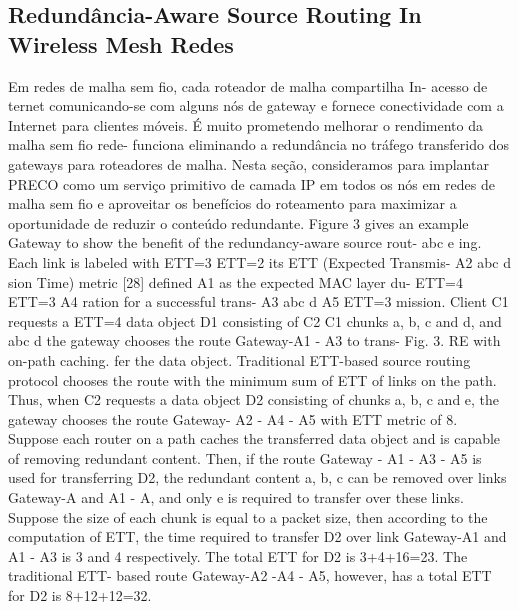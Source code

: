 \documentclass[12pt]{article}
\begin{document}
	\subsection{Redundância-Aware Source Routing In Wireless Mesh
		Redes}
	
	Em redes de malha sem fio, cada roteador de malha compartilha In-
	acesso de ternet comunicando-se com alguns nós de gateway
	e fornece conectividade com a Internet para clientes móveis. É muito
	prometendo melhorar o rendimento da malha sem fio rede-
	funciona eliminando a redundância no tráfego transferido
	dos gateways para roteadores de malha. Nesta seção, consideramos
	para implantar PRECO como um serviço primitivo de camada IP em todos os nós
	em redes de malha sem fio e aproveitar os benefícios do roteamento
	para maximizar a oportunidade de reduzir o conteúdo redundante.
	Figure 3 gives an example
	Gateway
	to show the benefit of the
	redundancy-aware source rout-
	abc e
	ing. Each link is labeled with
	ETT=3
	ETT=2
	its ETT (Expected Transmis-
	A2
	abc d
	sion Time) metric [28] defined
	A1
	as the expected MAC layer du-
	ETT=4
	ETT=3
	A4
	ration for a successful trans-
	A3
	abc d
	A5 ETT=3
	mission. Client C1 requests a
	ETT=4
	data object D1 consisting of
	C2
	C1
	chunks a, b, c and d, and
	abc d
	the gateway chooses the route
	Gateway-A1 - A3 to trans-
	Fig. 3. RE with on-path caching.
	fer the data object. Traditional
	ETT-based source routing protocol chooses the route with the
	minimum sum of ETT of links on the path. Thus, when C2
	requests a data object D2 consisting of chunks a, b, c and e,
	the gateway chooses the route Gateway- A2 - A4 - A5 with
	ETT metric of 8. Suppose each router on a path caches the
	transferred data object and is capable of removing redundant
	content. Then, if the route Gateway - A1 - A3 - A5 is used
	for transferring D2, the redundant content a, b, c can be
	removed over links Gateway-A and A1 - A, and only
	e is required to transfer over these links. Suppose the size of
	each chunk is equal to a packet size, then according to the
	computation of ETT, the time required to transfer D2 over
	link Gateway-A1 and A1 - A3 is 3 and 4 respectively.
	The total ETT for D2 is 3+4+16=23. The traditional ETT-
	based route Gateway-A2 -A4 - A5, however, has a total
	ETT for D2 is 8+12+12=32.
	
\end{document}
